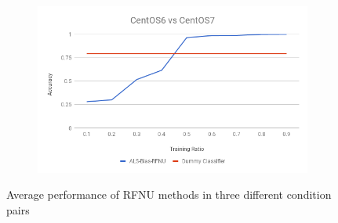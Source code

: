 \documentclass[10pt, conference, compsocconf]{IEEEtran}
\begin{document}
\begin{figure}[h!]
\begin{subfigure}[b]{0.8\linewidth}
        \end{subfigure}
        \begin{subfigure}[b]{0.8\linewidth}
                \includegraphics[width=\columnwidth]{figures/ALS-Bias/RFNU-ALS-Bias-6vs7-PFS}
        \end{subfigure}
        \caption{Average performance of RFNU methods in three different condition pairs}
        \label{fig:RFNU method}
\end{figure}
\end{document}
